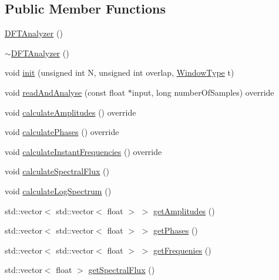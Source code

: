 \subsection*{Public Member Functions}
\begin{DoxyCompactItemize}
\item 
\hyperlink{class_d_f_t_analyzer_a743ddb6bd928abc015f53eff23ce2c25}{D\+F\+T\+Analyzer} ()
\item 
\hyperlink{class_d_f_t_analyzer_ae7dec6c4824431056d2d171d8edf8cb6}{$\sim$\+D\+F\+T\+Analyzer} ()
\item 
void \hyperlink{class_d_f_t_analyzer_ad777180fdef8e09e0f2246ffd254fc14}{init} (unsigned int N, unsigned int overlap, \hyperlink{_utility_8h_a476342970f954b62d70552bcbb5ee509}{Window\+Type} t)
\item 
void \hyperlink{class_d_f_t_analyzer_a770f6798a76d08c346238c4f1d6e653a}{read\+And\+Analyse} (const float $\ast$input, long number\+Of\+Samples) override
\item 
void \hyperlink{class_d_f_t_analyzer_aa1882d12d45eea36098449bcf460c1de}{calculate\+Amplitudes} () override
\item 
void \hyperlink{class_d_f_t_analyzer_a92edf947d0ea4b4182d95510fabaeaaf}{calculate\+Phases} () override
\item 
void \hyperlink{class_d_f_t_analyzer_a4ccfe430f6137293c2b83a6954805959}{calculate\+Instant\+Frequencies} () override
\item 
void \hyperlink{class_d_f_t_analyzer_aa3faf80a26cab80412da95ffd482a266}{calculate\+Spectral\+Flux} ()
\item 
void \hyperlink{class_d_f_t_analyzer_ad497c408116b7e4b8650f45deaf25d58}{calculate\+Log\+Spectrum} ()
\item 
std\+::vector$<$ std\+::vector$<$ float $>$ $>$ \hyperlink{class_d_f_t_analyzer_a5b583b5c2c785e6cc76b6248f2efdd72}{get\+Amplitudes} ()
\item 
std\+::vector$<$ std\+::vector$<$ float $>$ $>$ \hyperlink{class_d_f_t_analyzer_ab24cf7ea52ffaf283395461569d9437e}{get\+Phases} ()
\item 
std\+::vector$<$ std\+::vector$<$ float $>$ $>$ \hyperlink{class_d_f_t_analyzer_a29d51cf796bb9a763f067ff913799f24}{get\+Frequenies} ()
\item 
std\+::vector$<$ float $>$ \hyperlink{class_d_f_t_analyzer_a18e4a463ee3b28f14c5c511243d8a551}{get\+Spectral\+Flux} ()
\end{DoxyCompactItemize}


